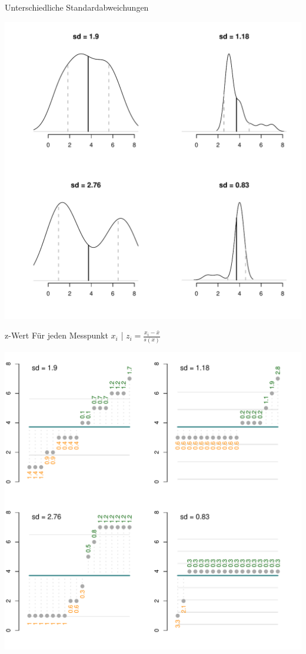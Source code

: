 \begin{frame}
  {Unterschiedliche Standardabweichungen}
  \begin{center}
    \includegraphics[height=0.9\textheight]{RVorlesung/stdevs}
  \end{center}
\end{frame}


\begin{frame}
  {z-Wert}
  Für jeden Messpunkt $x_i$ | \alert{$z_i=\frac{x_i-\bar{x}}{s(x)}$}\\
  \begin{center}
    \includegraphics[height=0.8\textheight]{RVorlesung/fourzs}
  \end{center}
\end{frame}

